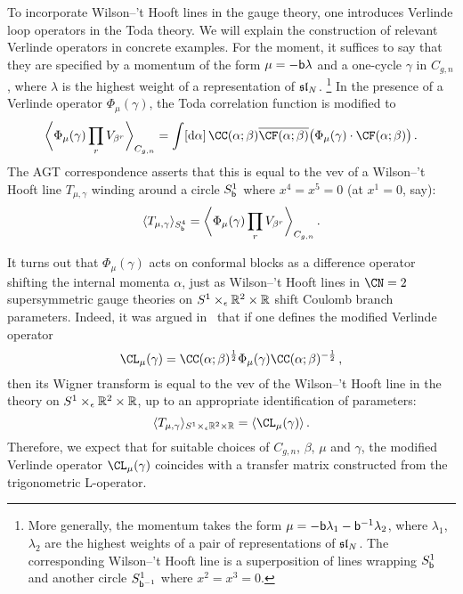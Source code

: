 To incorporate Wilson--'t Hooft lines in the gauge theory, one
introduces Verlinde loop operators in the Toda theory.  We will
explain the construction of relevant Verlinde operators in concrete
examples.  For the moment, it suffices to say that they are specified
by a momentum of the form $\mu = -\mathsf{b}\lambda$ and a one-cycle $\gamma$
in $C_{g,n}$, where $\lambda$ is the highest weight of a
representation of $\mathfrak{sl}_N$.%
%
\footnote{More generally, the momentum takes the form
  $\mu = -\mathsf{b}\lambda_1 - \mathsf{b}^{-1} \lambda_2$, where $\lambda_1$,
  $\lambda_2$ are the highest weights of a pair of representations of
  $\mathfrak{sl}_N$.  The corresponding Wilson--'t Hooft line is a
  superposition of lines wrapping $S^1_{\mathsf{b}}$ and another circle
  $S^1_{\mathsf{b}^{-1}}$ where $x^2 = x^3 = 0$.}
%
In the presence of a Verlinde operator $\Phi_\mu(\gamma)$, the Toda
correlation function is modified to
\begin{equation}
  \biggvev{\Phi_\mu(\gamma) \prod_r V_{\beta^r}}_{C_{g,n}}
  =
  \int [\rmd\alpha] \,
  \CC(\alpha; \beta) \overline{\CF(\alpha; \beta)}
  \bigl(\Phi_\mu(\gamma) \cdot \CF(\alpha; \beta)\bigr) \,.
\end{equation}
The AGT correspondence asserts \cite{Alday:2009fs, Drukker:2009id}
that this is equal to the vev of a Wilson--'t Hooft line
$T_{\mu,\gamma}$ winding around a circle $S^1_{\mathsf{b}}$ where
$x^4 = x^5 = 0$ (at $x^1 = 0$, say):
\begin{equation}
  \langle T_{\mu,\gamma} \rangle_{S^4_{\mathsf{b}}}
  =
  \biggl\langle \Phi_\mu(\gamma) \prod_r V_{\beta^r} \biggr\rangle_{C_{g,n}} \,.
\end{equation}

It turns out that $\Phi_\mu(\gamma)$ acts on conformal blocks as a
difference operator shifting the internal momenta $\alpha$, just as
Wilson--'t Hooft lines in $\CN = 2$ supersymmetric gauge theories on
$S^1 \times_\epsilon \mathbb{R}^2 \times \mathbb{R}$ shift Coulomb branch parameters.  Indeed, it
was argued in~\cite{Ito:2011ea} that if one defines the modified Verlinde
operator
\begin{equation}
  \label{eq:c-verlinde}
  \CL_\mu(\gamma)
  =
  \CC(\alpha; \beta)^{\frac12}
  \Phi_\mu(\gamma) \CC(\alpha; \beta)^{-\frac12} \,,
\end{equation}
then its Wigner transform is equal to the vev of the Wilson--'t Hooft
line in the theory on $S^1 \times_\epsilon \mathbb{R}^2 \times \mathbb{R}$, up to an appropriate
identification of parameters:
\begin{equation}
  \vev{T_{\mu,\gamma}}_{S^1 \times_\eps \R^2 \times \R}
  =
  \vev{\CL_\mu(\gamma)} \,.
\end{equation}
Therefore, we expect that for suitable choices of $C_{g,n}$, $\beta$,
$\mu$ and $\gamma$, the modified Verlinde operator $\CL_\mu(\gamma)$
coincides with a transfer matrix constructed from the trigonometric
L-operator.




